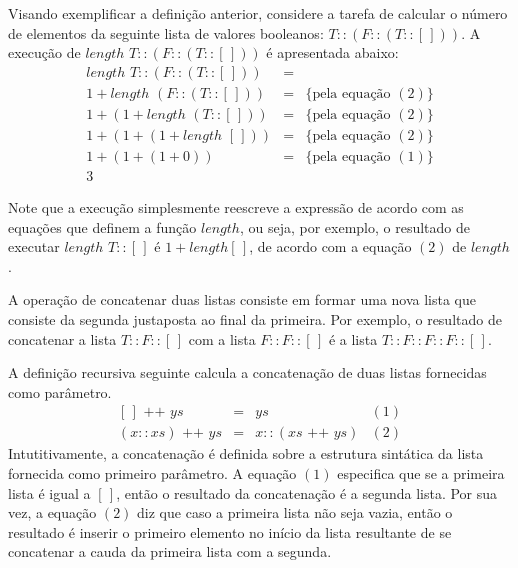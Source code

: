 \begin{Example}
Visando exemplificar a defini\c{c}\~ao anterior, considere a tarefa de calcular o n\'umero de elementos da seguinte lista de valores
booleanos: $T :: (F :: (T :: [\,]))$. A execu\c{c}\~ao de $length\,\,T :: (F :: (T :: [\,]))$ \'e apresentada abaixo:
\[
\begin{array}{lcl}
length\,\,T :: (F :: (T :: [\,])) & = & \\
1 + length\,\,(F :: (T :: [\,]))  & = & \{\text{pela equa\c{c}\~ao }(2)\}\\
1 + (1 + length\,\,(T :: [\,]))  & = & \{\text{pela equa\c{c}\~ao }(2)\}\\
1 + (1 + (1 + length\,\,[\,]))  & = & \{\text{pela equa\c{c}\~ao }(2)\}\\
1 + (1 + (1 + 0))  & = & \{\text{pela equa\c{c}\~ao }(1)\}\\
3                  &   & 
\end{array}
\]
\end{Example}

Note que a execu\c{c}\~ao simplesmente reescreve a express\~ao de acordo com as equa\c{c}\~oes que definem a fun\c{c}\~ao $length$, ou seja, por
exemplo, o resultado de executar $length\,\,T :: [\,]$  \'e $1 + length [\,]$, de acordo com a equa\c{c}\~ao $(2)$ de $length$.

A opera\c{c}\~ao de concatenar duas listas consiste em formar uma nova lista que consiste da segunda justaposta ao final da primeira. Por exemplo,
o resultado de concatenar a lista $T :: F :: [\,]$ com a lista $F :: F :: [\,]$ \'e a lista $T :: F :: F :: F :: [\,]$.

\begin{Definition}\label{def:concat:lists}
 A defini\c{c}\~ao recursiva seguinte calcula a concatena\c{c}\~ao de duas listas fornecidas como par\^ametro. 
 \[
  \begin{array}{lclr}
    [\,] \text{ ++ } ys & = & ys & (1)\\
    (x :: xs) \text{ ++ } ys & = & x :: (xs \text{ ++ } ys) & (2)
  \end{array}
  \]
Intutitivamente, a concatena\c{c}\~ao \'e definida sobre a estrutura sint\'atica da lista fornecida como primeiro par\^ametro. A equa\c{c}\~ao 
$(1)$ especifica que se a primeira lista \'e igual a $[\,]$, ent\~ao o resultado da concatena\c{c}\~ao \'e a segunda lista. Por sua vez,
a equa\c{c}\~ao $(2)$ diz que caso a primeira lista n\~ao seja vazia, ent\~ao o resultado \'e inserir o primeiro elemento no in\'icio da lista
resultante de se concatenar a cauda da primeira lista com a segunda.
\end{Definition}

